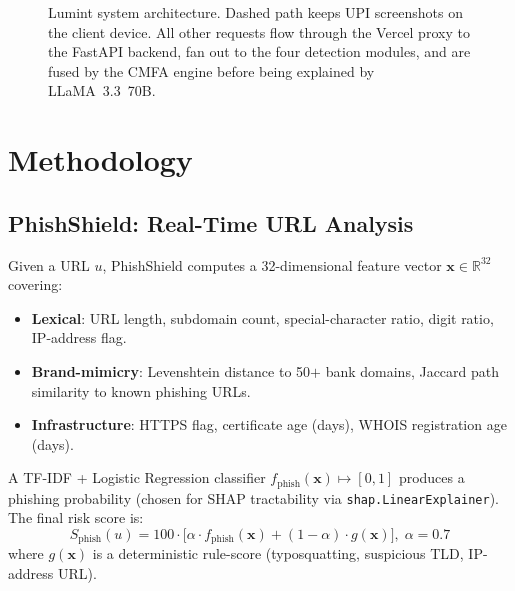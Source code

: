 \documentclass[conference]{IEEEtran}
\begin{document}
\begin{figure}[t]
\caption{Lumint system architecture. Dashed path keeps UPI screenshots
on the client device. All other requests flow through the Vercel proxy
to the FastAPI backend, fan out to the four detection modules, and are
fused by the CMFA engine before being explained by LLaMA~3.3~70B.}
\label{fig:arch}
\end{figure}

\section{Methodology}\label{sec:methodology}

\subsection{PhishShield: Real-Time URL Analysis}
Given a URL $u$, PhishShield computes a 32-dimensional feature vector
$\mathbf{x}\!\in\!\mathbb{R}^{32}$ covering:
\begin{itemize}
\item \textbf{Lexical}: URL length, subdomain count,
      special-character ratio, digit ratio, IP-address flag.
\item \textbf{Brand-mimicry}: Levenshtein distance to 50$+$ bank
      domains, Jaccard path similarity to known phishing URLs.
\item \textbf{Infrastructure}: HTTPS flag, certificate age (days),
      WHOIS registration age (days).
\end{itemize}

A TF-IDF + Logistic Regression classifier
$f_{\text{phish}}(\mathbf{x})\!\mapsto\![0,1]$ produces a phishing
probability (chosen for SHAP tractability via
\texttt{shap.LinearExplainer}).
The final risk score is:
\begin{equation}
S_{\text{phish}}(u) =
  100\cdot\bigl[\alpha\cdot f_{\text{phish}}(\mathbf{x})
  +(1{-}\alpha)\cdot g(\mathbf{x})\bigr],\;\alpha{=}0.7
\label{eq:phish}
\end{equation}
where $g(\mathbf{x})$ is a deterministic rule-score (typosquatting,
suspicious TLD, IP-address URL).
\end{document}
